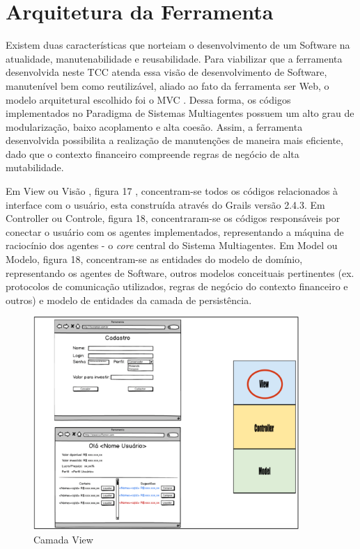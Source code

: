 \section{Arquitetura da Ferramenta}

Existem duas características que norteiam o desenvolvimento de um Software na atualidade, manutenabilidade e reusabilidade. Para viabilizar que a ferramenta desenvolvida neste TCC atenda essa visão de desenvolvimento de Software, manutenível bem como reutilizável, aliado ao fato da ferramenta ser Web, o modelo arquitetural escolhido foi o MVC \cite{krasner1988}. Dessa forma, os códigos implementados no Paradigma de Sistemas Multiagentes possuem um alto grau de modularização, baixo acoplamento e alta coesão. Assim, a ferramenta desenvolvida possibilita a realização de  manutenções de maneira mais eficiente, dado que o contexto financeiro compreende regras de negócio de alta mutabilidade. 

Em View ou Visão , figura 17 , concentram-se todos os códigos relacionados à interface com o usuário, esta construída através do Grails versão 2.4.3. Em Controller ou Controle, figura 18, concentraram-se os códigos responsáveis por conectar o usuário com os agentes implementados, representando a máquina de raciocínio dos agentes - o \textit{core} central do Sistema Multiagentes. Em Model ou Modelo, figura 18, concentram-se as entidades do modelo de domínio, representando os agentes de Software, outros modelos conceituais pertinentes (ex. protocolos de comunicação utilizados, regras de negócio do contexto financeiro e outros) e modelo de entidades da camada de persistência.

\begin{figure}[h]
\centering
\label{f17}
\includegraphics[width=0.9\textwidth]{figuras/f24}
\caption{Camada View}
\end{figure}

